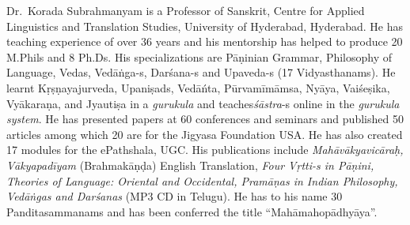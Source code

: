 Dr.~Korada Subrahmanyam is a Professor of Sanskrit, Centre for Applied Linguistics and Translation Studies, University of Hyderabad, Hyderabad. He has teaching experience of over 36 years and his mentorship has helped to produce 20 M.Phils and 8 Ph.Ds. His specializations are Pāṇinian Grammar, Philosophy of Language, Vedas, Vedāṅga-s, Darśana-s and Upaveda-s (17 Vidyasthanams). He learnt Kṛṣṇayajurveda, Upaniṣads, Vedāńta, Pūrvamīmāmsa, Nyāya, Vaiśeṣika, Vyākaraṇa, and Jyautiṣa in a \textit{gurukula} and teaches\break \textit{śāstra}-s online in the \textit{gurukula system}. He has presented papers at 60 conferences and seminars and published 50 articles among which 20 are for the Jigyasa Foundation USA. He has also created 17 modules for the ePathshala, UGC. His publications include \textit{Mahāvākyavicāraḥ, Vākyapadīyam} (Brahmakāṇḍa) English Translation, \textit{Four Vṛtti-s in Pāṇini, Theories of Language: Oriental and Occidental, Pramāṇas in Indian Philosophy, Vedāṅgas and Darśanas} (MP3 CD in Telugu). He has to his name 30 Panditasammanams and has been conferred the title “Mahāmahopādhyāya”.


